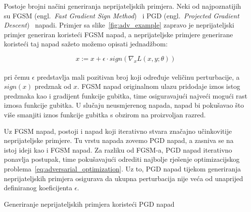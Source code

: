 \documentclass[times, utf8, zavrsni, numeric]{fer}
\begin{document}
Postoje brojni načini generiranja neprijateljskih primjera. 
Neki od najpoznatijih su FGSM (engl.\ \textit{Fast Gradient Sign Method})~\cite{goodfellow2014explaining} i PGD (engl.\ \textit{Projected Gradient Descent})~\cite{madry2017towards} napadi.
Primjer sa slike~\ref{fig:adv_example} zapravo je neprijateljski primjer generiran koristeći FGSM napad, a neprijateljske primjere generirane koristeći taj napad sažeto možemo opisati jednadžbom:

\begin{equation}
    x := x + \epsilon \cdot sign(\nabla_{x}L(x,y;\theta))
    \label{eq:fgsm}
\end{equation}
\\
pri čemu $\epsilon$ predstavlja mali pozitivan broj koji određuje veličinu perturbacije, a $sign(x)$ predznak od $x$. 
FGSM napad originalnom ulazu pridodaje iznos istog predznaka kao i gradijent funkcije gubitka, time osiguravajući najveći mogući rast iznosa funkcije gubitka. 
U slučaju neusmjerenog napada, napad bi pokušavao što više smanjiti iznos funkcije gubitka s obzirom na proizvoljan razred.

Uz FGSM napad, postoji i napad koji iterativno stvara značajno učinkovitije neprijateljske primjere. 
Tu vrstu napada zovemo PGD napad, a zasniva se na istoj ideji kao i FGSM napad. 
Za razliku od FGSM-a, PGD napad iterativno ponavlja postupak, time pokušavajući odrediti najbolje rješenje optimizacijskog problema~\ref{eq:adversarial_optimization}.
Uz to, PGD napad tijekom generiranja neprijateljskih primjera osigurava da ukupna perturbacija nije veća od unaprijed definiranog koeficijenta $\epsilon$.

\begin{algorithm}
    \caption{Generiranje neprijateljskih primjera koristeći PGD napad}
    \label{algo:pgd}
    \begin{algorithmic}
        \\\hrulefill
        \ENDFOR
    \end{algorithmic}
\end{algorithm}
\end{document}
